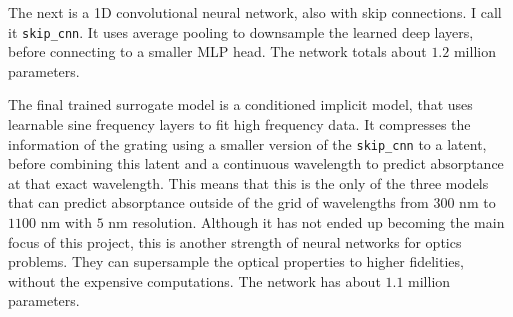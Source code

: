The next is a 1D convolutional neural network, also with skip connections. I call it \texttt{skip\_cnn}. It uses average pooling to downsample the learned deep layers, before connecting to a smaller MLP head.  The network totals about $1.2$ million parameters.

The final trained surrogate model is a conditioned implicit model, that uses learnable sine frequency layers to fit high frequency data. It compresses the information of the grating using a smaller version of the \texttt{skip\_cnn} to a latent, before combining this latent and a continuous wavelength to predict absorptance at that exact wavelength. 
This means that this is the only of the three models that can predict absorptance outside of the grid of wavelengths from $300$ nm to $1100$ nm with $5$ nm resolution. Although it has not ended up becoming the main focus of this project, this is another strength of neural networks for optics problems. 
They can supersample the optical properties to higher fidelities, without the expensive computations. The network has about $1.1$ million parameters.
